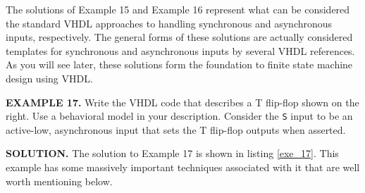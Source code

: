 The solutions of Example 15 and Example 16 represent what can be considered the standard VHDL approaches to handling synchronous and asynchronous inputs, respectively. The general forms of these solutions are actually considered templates for synchronous and asynchronous inputs by several VHDL references. As you will see later, these solutions form the foundation to finite state machine design using VHDL.

\begin{leftbar}
\begin{minipage}{0.5\linewidth}
\noindent
\textbf{EXAMPLE 17.}
Write the VHDL code that describes a T flip-flop shown on the right. Use a behavioral model in your description. Consider the \texttt{S} input to be an active-low, asynchronous input that sets the T flip-flop outputs when asserted.
\end{minipage}
\begin{minipage}{0.47\linewidth}
\begin{flushright}
\end{flushright}
\end{minipage}
\end{leftbar}
\noindent
\textbf{SOLUTION.} The solution to Example 17 is shown in listing \ref{exe_17}. This example has some massively important techniques associated with it that are well worth mentioning below.
